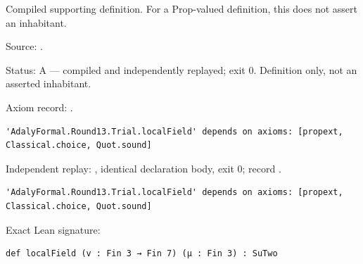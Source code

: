 \begin{definition}[bp-400]
\label{bp-400}
\leanok
Compiled supporting definition. For a Prop-valued definition, this does not assert an inhabitant.

\par Source: \texttt{}.
\par Status: A — compiled and independently replayed; exit 0. Definition only, not an asserted inhabitant.
\par Axiom record: \texttt{}.
\begin{verbatim}
'AdalyFormal.Round13.Trial.localField' depends on axioms: [propext, Classical.choice, Quot.sound]
\end{verbatim}
\par Independent replay: \texttt{}, identical declaration body, exit 0; record \texttt{}.
\begin{verbatim}
'AdalyFormal.Round13.Trial.localField' depends on axioms: [propext, Classical.choice, Quot.sound]
\end{verbatim}
\par Exact Lean signature:
\begin{verbatim}
def localField (v : Fin 3 → Fin 7) (μ : Fin 3) : SuTwo
\end{verbatim}
\end{definition}

